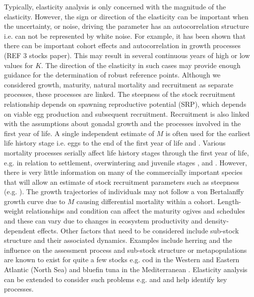 \documentclass{pnastwo}
\begin{document}
\begin{article}
Typically, elasticity analysis is only concerned with the magnitude of the elasticity.
However, the sign or direction of the elasticity can be important when the uncertainty,
or noise, driving the parameter has an autocorrelation structure i.e. can not be
represented by white noise. For example, it has been shown that there can be important
cohort effects and autocorrelation in growth processes (REF 3 stocks paper). This
may result in several continuous years of high or low values for $K$. The direction of
the elasticity in such cases may provide enough guidance for the determination of robust reference points.
Although we considered growth, maturity, natural mortality and recruitment as separate
processes, these processes are linked. The steepness of the stock recruitment relationship
depends on spawning reproductive potential (SRP), which depends on viable egg production \cite{trippel1999estimation}
and subsequent recruitment. Recruitment is also linked with the assumptions about gonadal
growth and the processes involved in the first year of life. A single independent
estimate of $M$ is often used for the earliest life history stage i.e. eggs to the
end of the first year of life \cite{houde1989subtleties} and \cite{houde2002mortality}. 
Various mortality processes serially
affect life history stages through the first year of life, e.g. in relation to
settlement, overwintering and juvenile stages \cite{Nash2012mearly}, 
\cite{mcgurk1986natural} and  \cite{pepin1991effect}. However, there
is very little information on many of the commercially important species that will
allow an estimate of stock recruitment parameters such as steepness (e.g. \cite{mangel2010reproductive}).
The growth trajectories of individuals may not follow a von Bertalanffy growth curve
due to $M$ causing differential mortality within a cohort. Length-weight relationships
and condition can affect the maturity ogives and schedules and these can vary due to
changes in ecosystem productivity and density-dependent effects. Other factors that
need to be considered include sub-stock structure and their associated dynamics.
Examples include herring \cite{dickey2010lessons} and the influence on the assessment process \cite{kell2009lumpers}
and sub-stock structure or metapopulations are known to exist for quite a few stocks
e.g. cod in the Western \cite{frank2001contemporary} and Eastern Atlantic (North Sea) \cite{heath2008model} and bluefin tuna
in the Mediterranean \cite{rooker2007life}.
Elasticity analysis can be extended to consider such problems e.g. \cite{root1998evaluating} and \cite{henle2004role} and help identify key processes.

\end{article}
\end{document}
